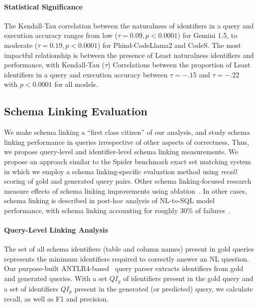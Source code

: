 \paragraph{\textbf{Statistical Significance}}
The Kendall-Tau correlation between the naturalness of identifiers in a query and execution accuracy ranges from low ($\tau = 0.09, p < 0.0001$) for Gemini 1.5, to moderate ($\tau = 0.19, p < 0.0001$) for Phind-CodeLlama2 and CodeS.
The most impactful relationship is between the presence of Least naturalness identifiers and performance, with Kendall-Tau ($\tau$) Correlations between the proportion of Least  identifiers in a query and execution accuracy between $\tau=-.15$ and $\tau=-.22$ with $p < 0.0001$ for all models.

\subsection{Schema Linking Evaluation}
\label{section:linking-evaluation}

We make schema linking a ``first class citizen'' of our analysis, and study schema linking performance in queries irrespective of other aspects of correctness. 
Thus, we propose query-level and identifier-level schema linking measurements.
We propose an approach similar to the Spider benchmark exact set matching system~\cite{Yu&al.18c} in which we employ a schema linking-specific evaluation method using \emph{recall} scoring of gold and generated query pairs.
Other schema linking-focused research measure effects of schema linking improvements using ablation~\cite{wang2020rat-sql, cao-etal-2021-lgesql, 10.1145/3534678.3539305, 49288}. 
In other cases, schema linking is described in post-hoc analysis of NL-to-SQL model performance, with schema linking accounting for roughly 30\% of failures~\cite{dong2023c3, pourreza2023dinsql}.

\paragraph{\textbf{Query-Level Linking Analysis}}
The set of all schema identifiers (table and column names) present in gold queries represents the minimum identifiers required to correctly answer an NL question.
Our purpose-built ANTLR4-based~\cite{Parr2014} query parser extracts identifiers from gold and generated queries.
With a set $QI_g$ of identifiers present in the gold query and a set of identifiers $QI_p$ present in the generated (or predicted) query, we calculate recall, as well as F1 and precision.

